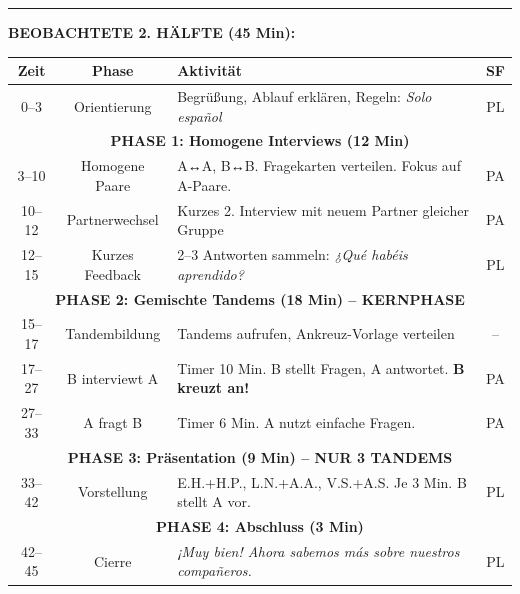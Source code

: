 \documentclass[11pt, a4paper]{article}
\begin{document}
\vspace{0.3cm}
\hrule
\vspace{0.2cm}


\begin{tcolorbox}[
    colback=varianteA!5,
    colframe=varianteA,
    title={\bfseries VARIANTE A: Tandem-Interview (EMPFOHLEN)},
    fonttitle=\bfseries,
    boxrule=0.8pt,
    top=2pt, bottom=2pt, left=4pt, right=4pt
]
\footnotesize
\textbf{BEOBACHTETE 2. HÄLFTE (45 Min):}

\vspace{0.2cm}

\begin{tabularx}{\textwidth}{|c|c|X|c|}
\hline
\rowcolor{varianteA!20}
\textbf{Zeit} & \textbf{Phase} & \textbf{Aktivität} & \textbf{SF} \\
\hline
0--3 & Orientierung & Begrüßung, Ablauf erklären, Regeln: \textit{Solo español} & PL \\
\hline
\multicolumn{4}{|c|}{\cellcolor{hellgrau}\textbf{PHASE 1: Homogene Interviews (12 Min)}} \\
\hline
3--10 & Homogene Paare & A↔A, B↔B. Fragekarten verteilen. Fokus auf A-Paare. & PA \\
\hline
10--12 & Partnerwechsel & Kurzes 2. Interview mit neuem Partner gleicher Gruppe & PA \\
\hline
12--15 & Kurzes Feedback & 2--3 Antworten sammeln: \textit{¿Qué habéis aprendido?} & PL \\
\hline
\multicolumn{4}{|c|}{\cellcolor{hellgrau}\textbf{PHASE 2: Gemischte Tandems (18 Min) -- KERNPHASE}} \\
\hline
15--17 & Tandembildung & Tandems aufrufen, Ankreuz-Vorlage verteilen & -- \\
\hline
17--27 & B interviewt A & Timer 10 Min. B stellt Fragen, A antwortet. \textbf{B kreuzt an!} & PA \\
\hline
27--33 & A fragt B & Timer 6 Min. A nutzt einfache Fragen. & PA \\
\hline
\multicolumn{4}{|c|}{\cellcolor{hellgrau}\textbf{PHASE 3: Präsentation (9 Min) -- NUR 3 TANDEMS}} \\
\hline
33--42 & Vorstellung & E.H.+H.P., L.N.+A.A., V.S.+A.S. Je 3 Min. B stellt A vor. & PL \\
\hline
\multicolumn{4}{|c|}{\cellcolor{hellgrau}\textbf{PHASE 4: Abschluss (3 Min)}} \\
\hline
42--45 & Cierre & \textit{¡Muy bien! Ahora sabemos más sobre nuestros compañeros.} & PL \\
\hline
\end{tabularx}
\end{tcolorbox}
\end{document}
